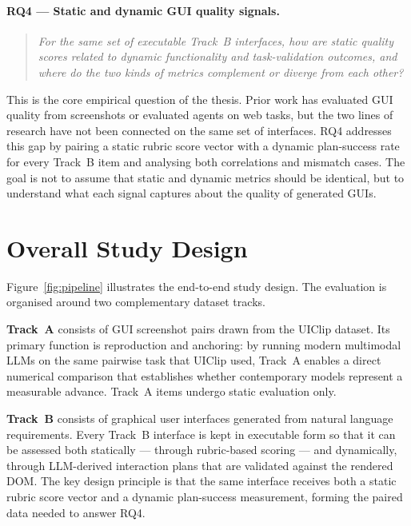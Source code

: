 \paragraph{RQ4 — Static and dynamic GUI quality signals.}
\begin{quote}
\textit{For the same set of executable Track~B interfaces,
how are static quality scores related to dynamic functionality and
task-validation outcomes, and where do the two kinds of metrics
complement or diverge from each other?}
\end{quote}
This is the core empirical question of the thesis.
Prior work has evaluated GUI quality from screenshots
or evaluated agents on web tasks, but the two lines of research
have not been connected on the same set of interfaces.
RQ4 addresses this gap by pairing a static rubric score vector
with a dynamic plan-success rate for every Track~B item
and analysing both correlations and mismatch cases. The goal is not to
assume that static and dynamic metrics should be identical, but to
understand what each signal captures about the quality of generated GUIs.

\section{Overall Study Design}
\label{sec:design}

Figure~\ref{fig:pipeline} illustrates the end-to-end study design.
The evaluation is organised around two complementary dataset tracks.

\textbf{Track~A} consists of GUI screenshot pairs drawn from the UIClip
dataset.
Its primary function is reproduction and anchoring: by running modern
multimodal LLMs on the same pairwise task that UIClip used, Track~A
enables a direct numerical comparison that establishes whether
contemporary models represent a measurable advance.
Track~A items undergo static evaluation only.

\textbf{Track~B} consists of graphical user interfaces generated from
natural language requirements.
Every Track~B interface is kept in executable form so that it can be
assessed both statically — through rubric-based scoring — and
dynamically, through LLM-derived interaction plans that are validated
against the rendered DOM.
The key design principle is that the same interface receives both a
static rubric score vector and a dynamic plan-success measurement,
forming the paired data needed to answer RQ4.

